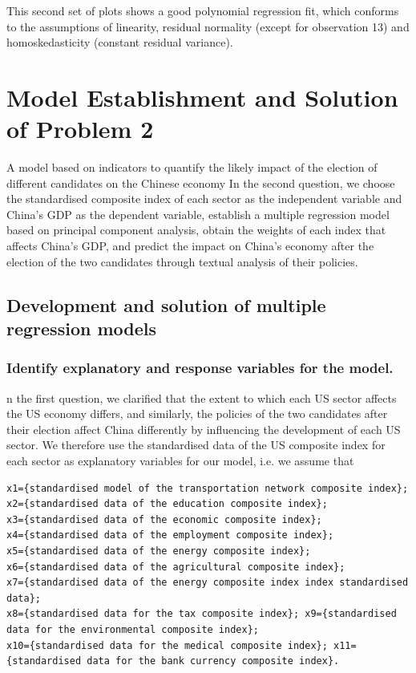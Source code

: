 \documentclass{apmcmthesis}
\begin{document}
This second set of plots shows a good polynomial regression fit, which conforms to the assumptions of linearity, residual normality (except for observation 13) and homoskedasticity (constant residual variance).

\section{Model Establishment and Solution of Problem 2}
A model based on indicators to quantify the likely impact of the election of different candidates on the Chinese economy
In the second question, we choose the standardised composite index of each sector as the independent variable and China's GDP as the dependent variable, establish a multiple regression model based on principal component analysis, obtain the weights of each index that affects China's GDP, and predict the impact on China's economy after the election of the two candidates through textual analysis of their policies.

\subsection{Development and solution of multiple regression models}

\subsubsection{Identify explanatory and response variables for the model.}
n the first question, we clarified that the extent to which each US sector affects the US economy differs, and similarly, the policies of the two candidates after their election affect China differently by influencing the development of each US sector. We therefore use the standardised data of the US composite index for each sector as explanatory variables for our model, i.e. we assume that 
\begin{lstlisting}
x1={standardised model of the transportation network composite index}; 
x2={standardised data of the education composite index};
x3={standardised data of the economic composite index};
x4={standardised data of the employment composite index};
x5={standardised data of the energy composite index};
x6={standardised data of the agricultural composite index}; 
x7={standardised data of the energy composite index index standardised data}; 
x8={standardised data for the tax composite index}; x9={standardised data for the environmental composite index}; 
x10={standardised data for the medical composite index}; x11={standardised data for the bank currency composite index}.
\end{lstlisting}
\end{document}
